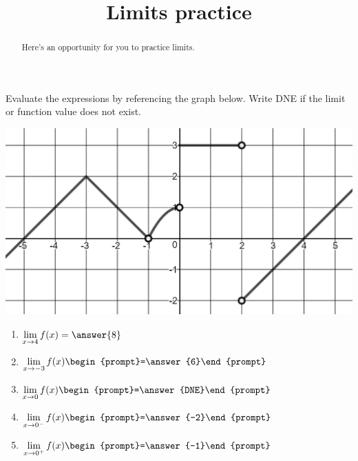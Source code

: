 \documentclass[handout]{ximera}
\title{Limits practice}
\begin{document}
\begin{abstract}
Here's an opportunity for you to practice limits.
\end{abstract}
\maketitle

\begin{exercise}
  Evaluate the expressions by referencing the graph below. Write DNE
  if the limit or function value does not exist.
  
\begin{center} \includegraphics[scale=0.5]{limgraph.png} \end{center}

\begin{enumerate}
\item $\displaystyle\lim_{x\to 4} f(x) =\answer{8}$  

\item $\displaystyle\lim_{x\to -3} f(x)\begin{prompt}=\answer{6}\end{prompt}$ 

\item $\displaystyle\lim_{x\to 0} f(x) \begin{prompt}=\answer{DNE}\end{prompt}$ 

\item $\displaystyle\lim_{x\to 0^-} f(x) \begin{prompt}=\answer{-2}\end{prompt}$ 

\item $\displaystyle\lim_{x\to 0^+} f(x) \begin{prompt}=\answer{-1}\end{prompt}$  


\end{enumerate}
\end{exercise}
\end{document}
